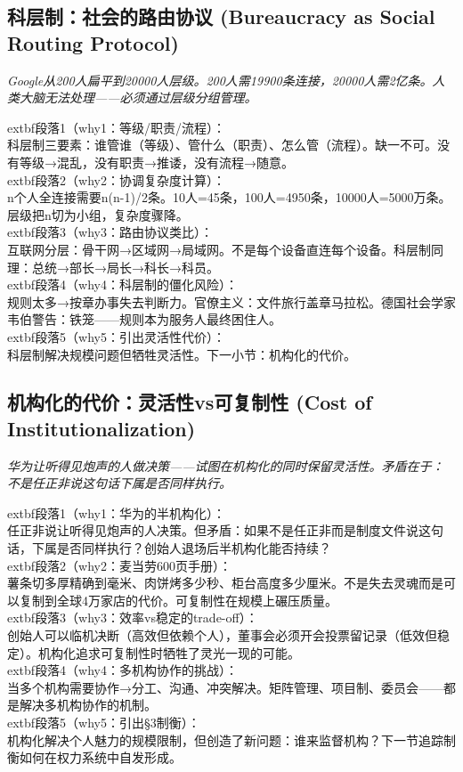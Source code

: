 \documentclass[a4paper,12pt]{book}
\newenvironment{motivation}{\begin{tcolorbox}[colback=gray!10,colframe=gray!60,title=\textit{本章动机},fonttitle=\bfseries,arc=0mm,leftrule=3mm]\small\itshape}{\end{tcolorbox}}
\begin{document}
\begin{motivation}
\begin{motivation}
\begin{motivation}
	\subsection{科层制：社会的路由协议 (Bureaucracy as Social Routing Protocol)}
	\begin{motivation}Google从200人扁平到20000人层级。200人需19900条连接，20000人需2亿条。人类大脑无法处理——必须通过层级分组管理。\end{motivation}
		extbf{段落1（why1：等级/职责/流程）}：\\科层制三要素：谁管谁（等级）、管什么（职责）、怎么管（流程）。缺一不可。没有等级→混乱，没有职责→推诿，没有流程→随意。\\	extbf{段落2（why2：协调复杂度计算）}：\\n个人全连接需要n(n-1)/2条。10人=45条，100人=4950条，10000人=5000万条。层级把n切为小组，复杂度骤降。\\	extbf{段落3（why3：路由协议类比）}：\\互联网分层：骨干网→区域网→局域网。不是每个设备直连每个设备。科层制同理：总统→部长→局长→科长→科员。\\	extbf{段落4（why4：科层制的僵化风险）}：\\规则太多→按章办事失去判断力。官僚主义：文件旅行盖章马拉松。德国社会学家韦伯警告：铁笼——规则本为服务人最终困住人。\\	extbf{段落5（why5：引出灵活性代价）}：\\科层制解决规模问题但牺牲灵活性。下一小节：机构化的代价。

	\subsection{机构化的代价：灵活性vs可复制性 (Cost of Institutionalization)}
	\begin{motivation}华为让听得见炮声的人做决策——试图在机构化的同时保留灵活性。矛盾在于：不是任正非说这句话下属是否同样执行。\end{motivation}
		extbf{段落1（why1：华为的半机构化）}：\\任正非说让听得见炮声的人决策。但矛盾：如果不是任正非而是制度文件说这句话，下属是否同样执行？创始人退场后半机构化能否持续？\\	extbf{段落2（why2：麦当劳600页手册）}：\\薯条切多厚精确到毫米、肉饼烤多少秒、柜台高度多少厘米。不是失去灵魂而是可以复制到全球4万家店的代价。可复制性在规模上碾压质量。\\	extbf{段落3（why3：效率vs稳定的trade-off）}：\\创始人可以临机决断（高效但依赖个人），董事会必须开会投票留记录（低效但稳定）。机构化追求可复制性时牺牲了灵光一现的可能。\\	extbf{段落4（why4：多机构协作的挑战）}：\\当多个机构需要协作→分工、沟通、冲突解决。矩阵管理、项目制、委员会——都是解决多机构协作的机制。\\	extbf{段落5（why5：引出§3制衡）}：\\机构化解决个人魅力的规模限制，但创造了新问题：谁来监督机构？下一节追踪制衡如何在权力系统中自发形成。


\end{motivation}
\end{motivation}
\end{motivation}
\end{document}
